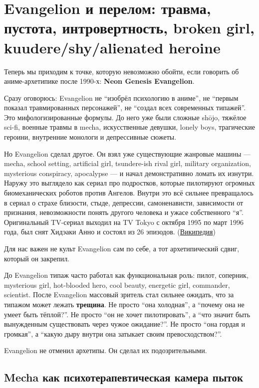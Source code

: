 \section{Evangelion и перелом: травма, пустота, интровертность, broken girl, kuudere/shy/alienated heroine}

Теперь мы приходим к точке, которую невозможно обойти, если говорить об
аниме-архетипике после 1990-х: \textbf{Neon Genesis Evangelion}.

Сразу оговорюсь: Evangelion не ``изобрёл психологию в аниме'', не
``первым показал травмированных персонажей'', не ``создал всех
современных типажей''. Это мифологизированные формулы. До него уже были
сложные shōjo, тяжёлое sci-fi, военные травмы в mecha, искусственные
девушки, lonely boys, трагические героини, внутренние монологи и
депрессивные сюжеты.

Но Evangelion сделал другое. Он взял уже существующие жанровые машины
--- mecha, school setting, artificial girl, tsundere-ish rival girl,
military organization, mysterious conspiracy, apocalypse --- и начал
демонстративно ломать их изнутри. Наружу это выглядело как сериал про
подростков, которые пилотируют огромных биомеханических роботов против
Ангелов. Внутри это всё сильнее превращалось в сериал о страхе близости,
стыде, депрессии, самоненависти, зависимости от признания, невозможности
понять другого человека и ужасе собственного ``я''. Оригинальный
TV-сериал выходил на TV Tokyo с октября 1995 по март 1996 года, был снят
Хидэаки Анно и состоял из 26 эпизодов.
(\href{https://en.wikipedia.org/wiki/Neon_Genesis_Evangelion?utm_source=chatgpt.com}{Википедия})

Для нас важен не культ Evangelion сам по себе, а тот архетипический
сдвиг, который он закрепил.

До Evangelion типаж часто работал как функциональная роль: пилот,
соперник, mysterious girl, hot-blooded hero, cool beauty, energetic
girl, commander, scientist. После Evangelion массовый зритель стал
сильнее ожидать, что за типажом может лежать \textbf{трещина}. Не просто
``она холодная'', а ``почему она не умеет быть тёплой?''. Не просто ``он
не хочет пилотировать'', а ``что значит быть вынужденным существовать
через чужое ожидание?''. Не просто ``она гордая и громкая'', а ``какую
дыру внутри она затыкает своим превосходством?''.

Evangelion не отменил архетипы. Он сделал их подозрительными.

\subsection*{Mecha как психотерапевтическая камера пыток}

